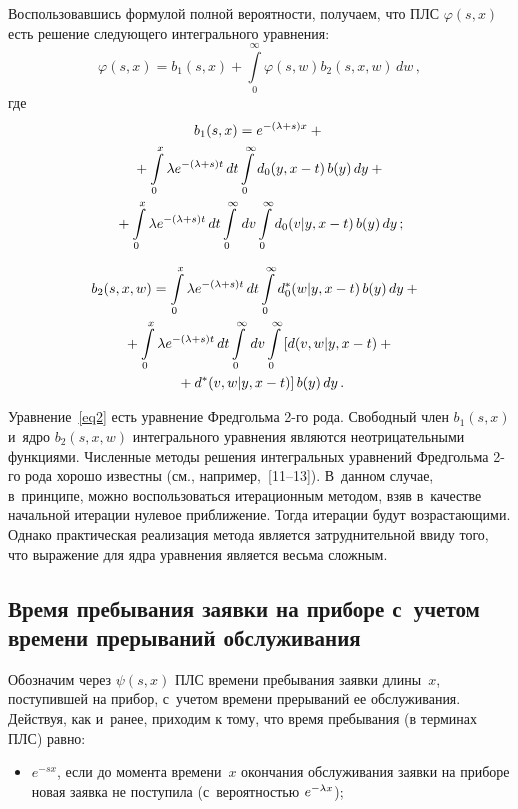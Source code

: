 \begin{multicols}{2}
Воспользовавшись формулой полной вероят\-ности, получаем,
что ПЛС $\varphi(s,x)$ есть решение следующего интегрального уравнения:
\begin{equation}
\label{eq2}
\varphi(s,x)=
b_1(s,x)+\int\limits_0^\infty \varphi(s,w)b_2(s,x,w) \, dw\,,
\end{equation}
где
\begin{multline*}
b_1(s,x) = e^{-(\lambda+s) x}+{}\\
{}+\int\limits_0^x \lambda e^{-(\lambda+s) t}\,dt
\int\limits_0^\infty d_0(y,x-t)\,b(y)\,dy
+{}\\
{} +
\int\limits_0^x \lambda e^{-(\lambda+s) t}\,dt \int\limits_0^\infty \, dv
\int\limits_0^\infty d_0(v|y,x-t)\, b(y)\, dy\,;
\end{multline*}

\vspace*{-12pt}

\noindent
\begin{multline*}
\hspace*{-5.58406pt}b_2(s,x,w) = \int\limits_0^x \lambda e^{-(\lambda+s) t}\,dt
\int\limits_0^\infty d^*_0(w|y,x-t)\, b(y)\, dy +{}
\\
{}+ \int\limits_0^x \lambda e^{-(\lambda+s) t}\,dt
\int\limits_0^\infty \, dv
\int\limits_0^\infty \left[ \vphantom{d^*}
d(v,w|y,x-t)+{}\right.\\
\left.{}+d^*(v,w|y,x-t)\right] b(y)\, dy\,.
\end{multline*}

Уравнение~\eqref{eq2} есть уравнение Фредгольма 2-го рода. Свободный член $b_1(s,x)$ и~ядро $b_2(s,x,w)$ интегрального уравнения являются неотрицательными функциями.
Численные методы решения интегральных уравнений Фредгольма 2-го
рода хорошо известны (см., например,~[11--13]).
В~данном случае, в~принципе, можно воспользоваться итерационным методом, взяв
в~качестве начальной итерации нулевое приближение. Тогда итерации
будут возрастающими. Однако практическая реализация метода является
затруднительной ввиду того, что выражение для ядра уравнения является
весьма сложным.


\subsection{Время пребывания заявки на приборе с~учетом времени прерываний
обслуживания}

Обозначим через $\psi(s,x)$ ПЛС времени пребывания заявки длины~$x$, поступившей на прибор, с~учетом времени прерываний ее обслуживания.
Действуя, как и~ранее, приходим к тому, что время пребывания (в терминах ПЛС) равно:
\begin{itemize}
\item  $e^{-s x}$, если до момента времени~$x$
окончания обслуживания заявки на приборе
новая заявка не поступила (с~вероятностью $e^{-\lambda x}$);


\end{itemize}
\end{multicols}
